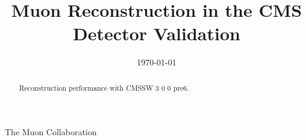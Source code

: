 \documentclass[a4paper]{cmspaper}
\newcommand{\pdfbookmark}[3][1]{}
\begin{document}
  \begin{titlepage}
    \date{\today}
    \title{Muon Reconstruction in the CMS Detector Validation}
    \begin{Authlist}
      \vspace{-4mm}
      The Muon Collaboration
    \end{Authlist}
    
    \pdfbookmark[1]{Abstract}{Abstract}
    \vspace{-9mm}
    \begin{abstract}
Reconstruction performance with CMSSW 3 0 0 pre6.
\end{abstract} 
  
\end{titlepage}

\setcounter{page}{2}



%
%
%
%
%
%
%
\nocite{*}

\pdfbookmark[1]{References}{References}


\clearpage


\end{document}
